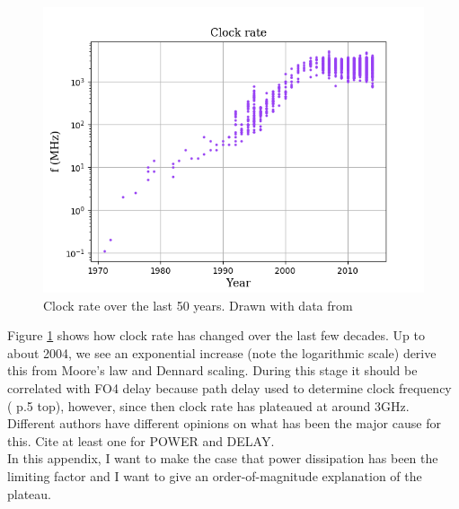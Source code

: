 \documentclass[12pt,a4paper]{article}
\newcommand{\note}{\textcolor{WildStrawberry}}
\begin{document}
\begin{figure}[!h]
	\centering
	\includegraphics[width=\textwidth]{Source/ClockRate.png}
	\caption{Clock rate over the last 50 years. Drawn with data from \cite{cpudb}} 
	\label{clockrate}
\end{figure}%
Figure \ref{clockrate} shows how clock rate has changed over the last few decades. Up to about 2004, we see an exponential increase (note the logarithmic scale) \note{derive this from Moore's law and Dennard scaling. During this stage it should be correlated with FO4 delay because path delay used to determine clock frequency (\cite{lipastiShen} p.5 top)}, however, since then clock rate has plateaued at around 3GHz.\\


Different authors have different opinions on what has been the major cause for this. \note{Cite at least one for POWER and DELAY}.\\
In this appendix, I want to make the case that power dissipation has been the limiting factor and I want to give an order-of-magnitude explanation of the plateau.\\
\end{document}

